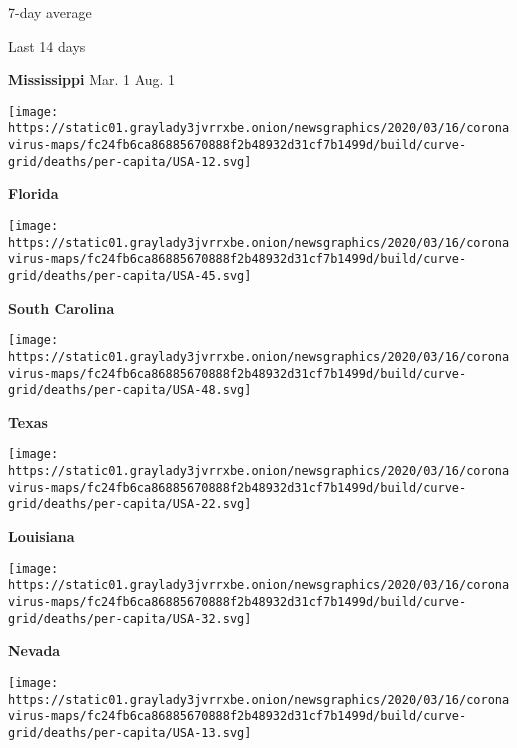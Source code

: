 7-day average

Last 14 days

\textbf{Mississippi} Mar. 1 Aug. 1

\href{https://www.nytimes3xbfgragh.onion/interactive/2020/us/florida-coronavirus-cases.html}{}

\texttt{[image: https://static01.graylady3jvrrxbe.onion/newsgraphics/2020/03/16/coronavirus-maps/fc24fb6ca86885670888f2b48932d31cf7b1499d/build/curve-grid/deaths/per-capita/USA-12.svg]}

\textbf{Florida}

\href{https://www.nytimes3xbfgragh.onion/interactive/2020/us/south-carolina-coronavirus-cases.html}{}

\texttt{[image: https://static01.graylady3jvrrxbe.onion/newsgraphics/2020/03/16/coronavirus-maps/fc24fb6ca86885670888f2b48932d31cf7b1499d/build/curve-grid/deaths/per-capita/USA-45.svg]}

\textbf{South Carolina}

\href{https://www.nytimes3xbfgragh.onion/interactive/2020/us/texas-coronavirus-cases.html}{}

\texttt{[image: https://static01.graylady3jvrrxbe.onion/newsgraphics/2020/03/16/coronavirus-maps/fc24fb6ca86885670888f2b48932d31cf7b1499d/build/curve-grid/deaths/per-capita/USA-48.svg]}

\textbf{Texas}

\href{https://www.nytimes3xbfgragh.onion/interactive/2020/us/louisiana-coronavirus-cases.html}{}

\texttt{[image: https://static01.graylady3jvrrxbe.onion/newsgraphics/2020/03/16/coronavirus-maps/fc24fb6ca86885670888f2b48932d31cf7b1499d/build/curve-grid/deaths/per-capita/USA-22.svg]}

\textbf{Louisiana}

\href{https://www.nytimes3xbfgragh.onion/interactive/2020/us/nevada-coronavirus-cases.html}{}

\texttt{[image: https://static01.graylady3jvrrxbe.onion/newsgraphics/2020/03/16/coronavirus-maps/fc24fb6ca86885670888f2b48932d31cf7b1499d/build/curve-grid/deaths/per-capita/USA-32.svg]}

\textbf{Nevada}

\href{https://www.nytimes3xbfgragh.onion/interactive/2020/us/georgia-coronavirus-cases.html}{}

\texttt{[image: https://static01.graylady3jvrrxbe.onion/newsgraphics/2020/03/16/coronavirus-maps/fc24fb6ca86885670888f2b48932d31cf7b1499d/build/curve-grid/deaths/per-capita/USA-13.svg]}

